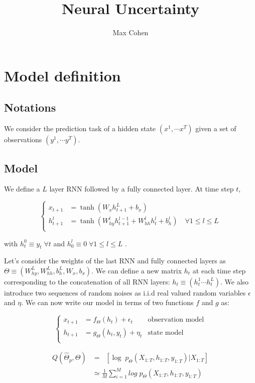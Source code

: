 \documentclass[11pt,a4paper]{report}
\begin{document}
\title{Neural Uncertainty}
\author{Max Cohen}
\maketitle

\chapter{Model definition}
\section{Notations}
We consider the prediction task of a hidden state $(x^1, \cdots x^T)$ given a set of observations $(y^1, \cdots y^T)$.

\section{Model}
We define a $L$ layer RNN followed by a fully connected layer. At time step $t$,

\begin{equation*}
    \left\{
    \begin{aligned}
        x_{t+1}   & = \tanh(W_x h_{t+1}^L + b_x)                                                               \\
        h_{t+1}^l & = \tanh(W_{hy}^l h^{l-1}_{t+1} + W_{hh}^l h^{l}_{t} + b_h^l) \quad \forall 1 \leq l \leq L \\
    \end{aligned}
    \right.
\end{equation*}

with $h_{t}^0 \equiv y_{t} \; \forall t$ and $h_{0}^l \equiv 0 \; \forall 1 \leq l \leq L$ .

Let's consider the weights of the last RNN and fully connected layers as $\Theta \equiv (W_{hy}^L, W_{hh}^L, b_h^L, W_x, b_x)$. We can define a new matrix $h_t$ at each time step corresponding to the concatenation of all RNN layers: $h_t \equiv (h_t^1 \cdots h_t^L)$. We also introduce two sequences of random noises as i.i.d real valued random variables $\epsilon$ and $\eta$. We can now write our model in terms of two functions $f$ and $g$ as:

\begin{equation}
    \left\{
    \begin{aligned}
        x_{t+1} & = f_\Theta(h_t) + \epsilon_t  & \text{observation model} \\
        h_{t+1} & = g_\Theta(h_t, y_t) + \eta_t & \text{state model}       \\
    \end{aligned}
    \right.
\end{equation}

\begin{align*}
    Q(\hat \Theta_p, \Theta) & = \mathop{\mathbb{E}_{\hat \Theta_p}} \left[ \log \; p_{\Theta}(X_{1:T}, h_{1:T}, y_{1:T}) | X_{1:T} \right] \\
                             & \simeq \frac{1}{M} \sum_{i=1}^M  log \; p_{\Theta}(X_{1:T}, h_{1:T}, y_{1:T})
\end{align*}
\end{document}
